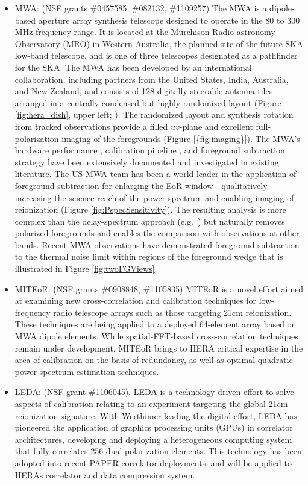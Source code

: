 \documentclass[preprint]{aastex}
\begin{document}
\begin{itemize}[noitemsep,nolistsep]
\item{MWA:} (NSF grants \#0457585, \#082132, \#1109257) 
The MWA is a dipole-based aperture array synthesis telescope designed
to operate in the 80 to 300 MHz frequency range.
It is located at the
Murchison Radio-astronomy Observatory (MRO) in Western Australia, the
planned site of the future SKA low-band
telescope, and is one of three telescopes designated as a pathfinder
for the SKA. 
The MWA has been developed by an international collaboration,
including partners from the United States, India, Australia, and New
Zealand, and consists of
128 digitally steerable antenna tiles arranged in a centrally
condensed but highly randomized layout (Figure \ref{fig:hera_dish}, upper left;
\citealt{tingay_et_al2013_trunc}). The randomized layout and synthesis rotation
from tracked observations provide a filled $uv$-plane and excellent
full-polarization imaging of the foregrounds (Figure \ref{{fig:imaging}}).
The MWA's hardware performance \citep{bowman_et_al2007}, calibration pipeline
\citep{mitchell_et_al2008}, and foreground subtraction strategy \citep{morales_et_al2006}
have been extensively documented and investigated
in existing literature.
The US MWA team has been a world leader in the application of 
foreground subtraction for
enlarging the EoR window---qualitatively increasing the science
reach of the power spectrum and enabling imaging of reionization (Figure
\ref{fig:PspecSensitivity}). The resulting analysis is more complex than the
delay-spectrum approach (e.g.\ \citealt{hazelton_et_al2013}) but naturally
removes polarized foregrounds \citep{moore_et_al2013} and enables the
comparison with observations at other bands. Recent MWA observations have
demonstrated foreground subtraction to the thermal noise limit 
within regions of the foreground wedge that is illustrated in Figure \ref{fig:twoFGViews}.

\item{MITEoR:} (NSF grants \#0908848, \#1105835) MITEoR is a novel effort aimed at
examining new cross-correlation and calibration techniques for low-frequency radio telescope
arrays such as those targeting 21cm reionization.  These techniques are being applied
to a deployed 64-element array based on MWA dipole elements.  While spatial-FFT-based cross-correlation
techniques remain under development, MITEoR brings to HERA critical expertise in the area
of calibration on the basis of redundancy, as well as optimal quadratic power spectrum estimation techniques.

\item{LEDA:} (NSF grant \#1106045). LEDA is a technology-driven effort to solve aspects of calibration relating
to an experiment targeting the global 21cm reionization signature.  With Werthimer leading the digital effort,
LEDA has pioneered the application of graphics processing units (GPUs) in correlator architectures, developing
and deploying a heterogeneous computing system that fully correlates 256 dual-polarization elements.  This
technology has been adopted into recent PAPER correlator deployments, and will be applied to HERAs correlator
and data compression system.
\end{itemize}
\end{document}
